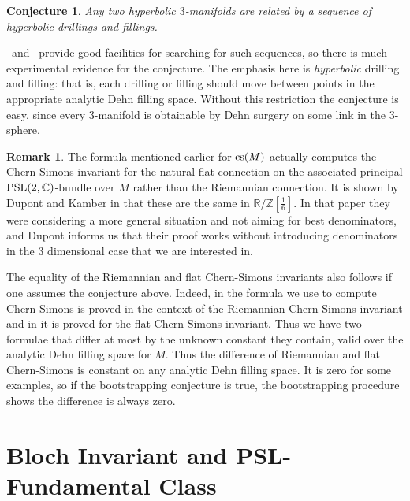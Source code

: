 \documentclass[a4paper]{amsart}
\def\Z{{\mathbb Z}}
\def\R{{\mathbb R}}
\def\C{{\mathbb C}}
\def\psl2c{\mbox{\rm PSL}(2,\C)}
\newtheorem{conjecture}[theorem]{Conjecture}
\theoremstyle{definition}
\newtheorem{remark}[theorem]{Remark}
\begin{document}
\begin{conjecture}
Any two hyperbolic $3$-manifolds are related by a sequence of
hyperbolic drillings and fillings.
\end{conjecture}

\snap\ and \snappea\ provide good facilities for searching for such
sequences, so there is much experimental evidence for the conjecture.
The emphasis here is \emph{hyperbolic} drilling and filling: that is,
each drilling or filling should move between points in the appropriate
analytic Dehn filling space.  Without this restriction the conjecture
is easy, since every $3$-manifold is obtainable by Dehn surgery on
some link in the $3$-sphere.

\begin{remark}\label{CS remark}
The formula mentioned earlier for $\cs(M)$ actually computes the
Chern-Simons invariant for the natural flat connection 
on the associated principal $\psl2c$-bundle over $M$
rather than the
Riemannian connection.  It is shown by Dupont and Kamber in
\cite{dupont-kamber} that these are the same in $\R/\Z[\frac16]$.
In that paper they were considering a more general situation and not
aiming for best denominators, and Dupont informs us that their proof
works without introducing denominators in the $3$ dimensional case that
we are interested in.

The equality of the Riemannian and flat Chern-Simons invariants also
follows if one assumes the conjecture above.  Indeed, in
\cite{yoshida} the formula we use to compute Chern-Simons is proved in
the context of the Riemannian Chern-Simons invariant and in
\cite{neumann-in-progress} it is proved for the flat Chern-Simons
invariant.  Thus we have two formulae that differ at most by the
unknown constant they contain, valid over the analytic Dehn filling
space for $M$.  Thus the difference of Riemannian and flat
Chern-Simons is constant on any analytic Dehn filling space.  It is
zero for some examples, so if the bootstrapping conjecture is true,
the bootstrapping procedure shows the difference is always zero.
\end{remark}



\def\snap{{Snap}}
\def\snappea{{SnapPea}} 
\def\Bloch{\mathcal B}
\def\Borel{\operatorname{Borel}}
\def\Prebloch{\mathcal P}
\def\cs{\operatorname{cs}}
\def\rank{\operatorname{rank}}
\def\PSL{\operatorname{PSL}}

\section{Bloch Invariant and PSL-Fundamental Class} 
\end{document}
